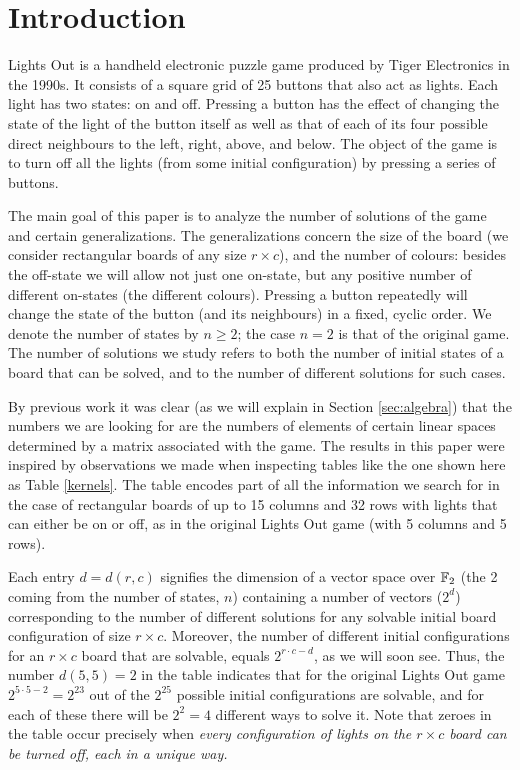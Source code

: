\section*{Introduction}\label{sec:intro}
Lights Out is a handheld electronic puzzle game produced by Tiger Electronics in
the 1990s. It consists of a square grid of 25 buttons that also act as lights.
Each light has two states: on and off.  Pressing a button has the effect of
changing the state of the light of the button itself as well as that of each of
its four possible direct neighbours to the left, right, above, and below.
The object of the game is to turn off all the lights (from some initial
configuration) by pressing a series of buttons.

The main goal of this paper is to analyze the number of
solutions of the game and certain generalizations.
The generalizations concern the size of the board (we consider
rectangular boards of any size $r\times c$), and the number of colours:
besides the off-state we will allow not just one on-state,
but any positive number of different on-states (the different
colours). Pressing a button repeatedly will change the state
of the button (and its neighbours) in a fixed, cyclic order.
We denote the number of states by $n\geq 2$; the case $n=2$
is that of the original game.
The number of solutions we study refers to both the number of
initial states of a board that can be solved, and to the number
of different solutions for such cases.

By previous work it was clear (as we will explain in
Section \ref{sec:algebra}) that the numbers we are looking for
are the numbers of elements of certain linear spaces determined
by a matrix associated with the game. The results in this paper
were inspired by observations we made when inspecting
tables like the one shown here as Table \ref{kernels}.
The table encodes part of all the information we search for
in the case of rectangular boards of up to 15 columns and
32 rows with lights that can either be on or off, as in the
original Lights Out game (with 5 columns and 5 rows).

Each entry $d=d(r, c)$ signifies the dimension of a vector
space over $\mathbb F_2$ (the 2 coming from the number of states, $n$)
containing a number of vectors ($2^d$) corresponding to
the number of different solutions for any solvable initial board
configuration of size $r\times c$.
Moreover, the number of different initial configurations for 
an $r\times c$ board
that are solvable, equals $2^{r\cdot c-d}$, as we will soon see.
Thus, the number $d(5,5)=2$ in the table indicates that for
the original Lights Out game $2^{5\cdot 5-2}=2^{23}$ out of the $2^{25}$
possible initial configurations are solvable,
and for each of these there will be $2^2=4$ different ways
to solve it.
Note that zeroes in the table occur precisely when 
\em{every} configuration of lights on the $r\times c$ board can be
turned off, each in a \em{unique} way.

